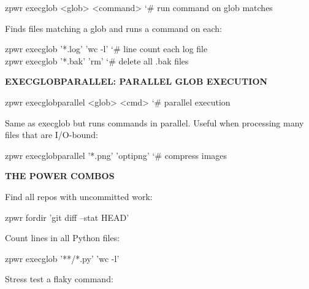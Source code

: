 \documentclass[11pt,a4paper,twoside]{book}
\begin{document}
\begin{codebox}
\color{neongreen}zpwr execglob <glob> <command>      {\char`\#} run command on glob matches\\
\end{codebox}

Finds files matching a glob and runs a command on each:

\begin{codebox}
\color{neongreen}zpwr execglob '*.log' 'wc -l'      {\char`\#} line count each log file\\
\color{neongreen}zpwr execglob '*.bak' 'rm'         {\char`\#} delete all .bak files\\
\end{codebox}


\vspace{12pt}
{\bfseries\color{neonyellow} EXECGLOBPARALLEL: PARALLEL GLOB EXECUTION}\vspace{4pt}

\begin{codebox}
\color{neongreen}zpwr execglobparallel <glob> <cmd>  {\char`\#} parallel execution\\
\end{codebox}

Same as execglob but runs commands in parallel. Useful when processing many files that are I/O-bound:

\begin{codebox}
\color{neongreen}zpwr execglobparallel '*.png' 'optipng'  {\char`\#} compress images\\
\end{codebox}


\vspace{12pt}
{\bfseries\color{neonyellow} THE POWER COMBOS}\vspace{4pt}

Find all repos with uncommitted work:

\begin{codebox}
\color{neongreen}zpwr fordir 'git diff --stat HEAD'\\
\end{codebox}

Count lines in all Python files:

\begin{codebox}
\color{neongreen}zpwr execglob '**/*.py' 'wc -l'\\
\end{codebox}

Stress test a flaky command:
\end{document}
